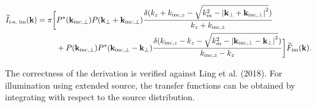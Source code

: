 \documentclass{mynotes}
\begin{document}
\begin{equation}
	\begin{aligned}
		\widetilde{I}_{\text{i-s, im}}(\mathbf{k})
		= \pi
		\bigg[
		 & P^*(\mathbf{k_{\text{inc}, \perp}})P(\mathbf{k}_{\perp}+\mathbf{k}_{\text{inc}, \perp})
			\frac{\delta(k_z + k_{\text{inc}, z} - \sqrt{k_m^2 - \abs{\mathbf{k}_{\perp}+\mathbf{k}_{\text{inc}, \perp}}^2})}
		{k_z+k_{\text{inc},z}}                                                                      \\
		 & +P(\mathbf{k_{\text{inc}, \perp}})P^*(\mathbf{k_{\text{inc}, \perp}}-\mathbf{k_{\perp}})
			\frac{\delta(k_{\text{inc}, z} - k_z - \sqrt{k_m^2 - \abs{\mathbf{k}_{\text{inc}, \perp}-\mathbf{k}_{\perp}}^2})}
			{k_{\text{inc}, z} - k_z}
		\bigg] \widetilde{F}_{\text{im}}(\mathbf{k}).                                               \\
	\end{aligned}
\end{equation}

The correctness of the derivation is verified against Ling et al. (2018).
For illumination using extended source, the transfer functions can be obtained
by integrating with respect to the source distribution.
\end{document}

